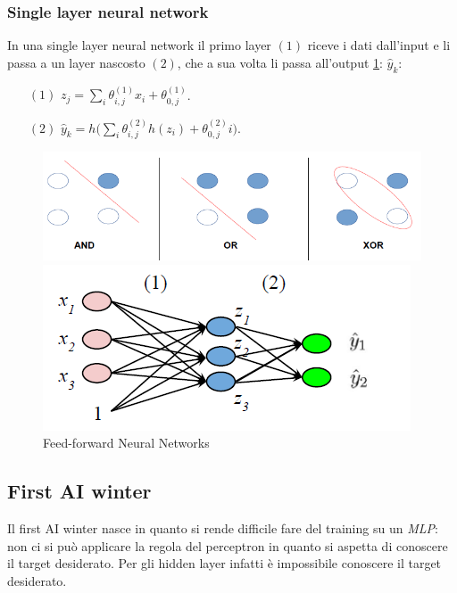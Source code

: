 		\subsubsection{Single layer neural network}
		In una single layer neural network il primo layer $(1)$ riceve i dati dall'input e li passa a un layer nascosto $(2)$, che a sua volta li passa all'output \ref{fig:chapter11-02}: $\hat{y}_k$:
		\begin{itemize}
			\item[$(1)$] $z_j = \sum\limits_i\theta^{(1)}_{i,j}x_i + \theta_{0,j}^{(1)}$.
			\item[$(2)$] $\hat{y}_k = h\bigl(\sum\limits_i\theta^{(2)}_{i,j}h(z_i)+\theta^{(2)}_{0,j}i\bigr)$.
			\end{itemize}
		\begin{figure}
			\centering
			\begin{minipage}{.5\textwidth}
				\centering
				\includegraphics[width=1\linewidth]{imgs/chapter11/img1}
				\caption{Problemi linearmente e non linearmente separabili}
				\label{fig:chapter11-01}
			\end{minipage}%
			\begin{minipage}{.5\textwidth}
				\centering
				\includegraphics[width=0.7\linewidth]{imgs/chapter11/img2}
				\caption{Feed-forward Neural Networks}
				\label{fig:chapter11-02}
			\end{minipage}
		\end{figure}


	\subsection{First AI winter}
	Il first AI winter nasce in quanto si rende difficile fare del training su un \emph{MLP}: non ci si pu\`o applicare la regola del perceptron in quanto si aspetta di conoscere il target desiderato.
	Per gli hidden layer infatti \`e impossibile conoscere il target desiderato.

